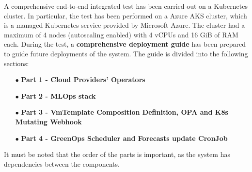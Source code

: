 A comprehensive end-to-end integrated test has been carried out on a Kubernetes cluster. 
In particular, the test has been performed on a Azure AKS cluster, which is a managed Kubernetes service provided by Microsoft Azure.
The cluster had a maximum of 4 nodes (autoscaling enabled) with 4 vCPUs and 16 GiB of RAM each.
During the test, a \textbf{comprehensive deployment guide} has been prepared to guide future deployments of the system.
The guide is divided into the following sections:
\begin{itemize}[itemsep=0.2pt, topsep=1pt]
    \item[$\bullet$] \textbf{Part 1 - Cloud Providers' Operators}
    \item[$\bullet$] \textbf{Part 2 - MLOps stack}
    \item[$\bullet$] \textbf{Part 3 - VmTemplate Composition Definition, OPA and K8s Mutating Webhook}
    \item[$\bullet$] \textbf{Part 4 - GreenOps Scheduler and Forecasts update CronJob}
\end{itemize}

It must be noted that the order of the parts is important, as the system has dependencies between the components. \newline

